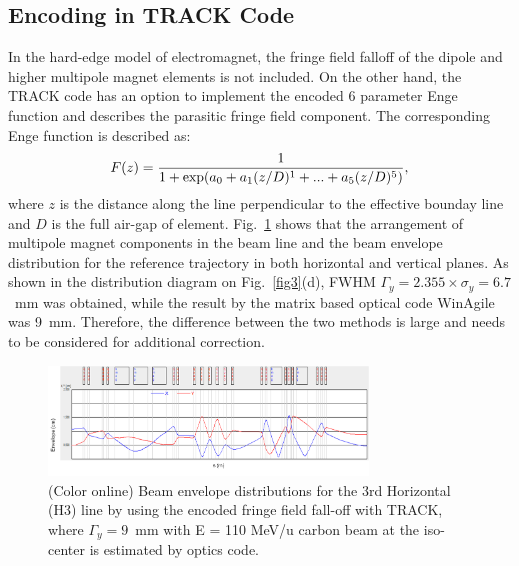 \documentclass[jkps,preprint,fleqn,showpacs,showkeys]{revtex4}
\begin{document}
\subsection{Encoding in TRACK Code}
In the hard-edge model of electromagnet, the fringe field falloff of the dipole and higher multipole magnet elements is not included.
On the other hand, the TRACK code has an option to implement the encoded 6 parameter Enge function\cite{Enge}
and describes the parasitic fringe field component.  
The corresponding Enge function is described as\cite{EngeTrack}:
\[
F(z) = \frac{1}{1+{\rm exp}(a_{0}+a_{1}(z/D)^{1}+...+a_{5}(z/D)^{5})}, 
\]
where $z$ is the distance along the line perpendicular to the effective bounday line and $D$ is the full air-gap of element.
Fig.~\ref{fig2} shows that the arrangement of multipole magnet components in the beam line and
the beam envelope distribution for the reference trajectory in both horizontal and vertical planes.
As shown in the distribution diagram on Fig.~\ref{fig3}(d), FWHM $\Gamma_{y} = 2.355 \times \sigma_{y} = 6.7$~mm was obtained,
while the result by the matrix based optical code WinAgile was 9~mm.
Therefore, the difference between the two methods is large and needs to be considered for additional correction.
\begin{figure}[h]
  \begin{center}
    \includegraphics[width=8.5cm]{Fig03.png}      
    \caption{(Color online) Beam envelope distributions for the 3rd Horizontal (H3) line by using the encoded fringe field fall-off with TRACK, 
      where $\Gamma_{y} = 9$~mm with E = 110 MeV/u carbon beam at the iso-center is estimated by optics code.}
    \label{fig2}
  \end{center}
\end{figure}
\end{document}
